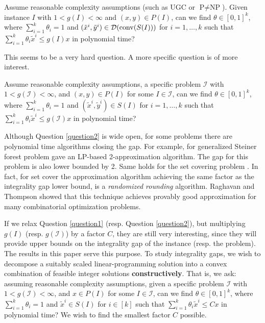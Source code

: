 \begin{question*}\label{question1}
	Assume reasonable complexity assumptions (such as UGC or $\textrm{P}\neq \textrm{NP}$). Given instance $I$ with $1<g(I)<\infty$ and $(x,y)\in P(I)$, can we find $\theta \in [0,1]^k$, where $\sum_{i=1}^{k}\theta_i =1$ and $(\tilde{x}^i,\tilde{y}^i)\in \operatorname{\mathcal{D}}(\operatorname{conv}(S(I)))$ for $i=1,\ldots,k$ such that $\sum_{i=1}^{k}\theta_i \tilde{x}^i\leq g(I)x$ in polynomial time?
\end{question*}

This seems to be a very hard question. A more specific question is of more interest.

\begin{question}\label{question2}
	Assume reasonable complexity assumptions, a specific problem $\mathcal{I}$ with  $1<g({\mathcal{I}})<\infty$, and $(x,y)\in P(I)$ for some $I\in \mathcal{I}$, can we find $\theta \in [0,1]^k$, where $\sum_{i=1}^{k}\theta_i =1$ and $(\tilde{x}^i,\tilde{y}^i)\in S(I)$ for $i=1,\ldots,k$ such that $\sum_{i=1}^{k}\theta_i \tilde{x}^i\leq g(\mathcal{I})x$ in polynomial time?
\end{question}
Although Question \ref{question2} is wide open, for some problems there are polynomial time algorithms closing the gap. For example, for generalized Steiner forest problem \cite{jain} gave an LP-based 2-approximation algorithm. The gap for this problem is also lower bounded by 2. Same holds for the set covering problem \cite{randomizedrounding}. In fact, for set cover the approximation algorithm achieving the same factor as the integrality gap lower bound, is a \textit{randomized rounding} algorithm. Raghavan and Thompson \cite{randomizedrounding} showed that this technique achieves provably good approximation for many combinatorial optimization problems.  

If we relax Question \ref{question1} (resp. Question \ref{question2}), but multiplying $g(I)$ (resp. $g(\mathcal{I})$) by a factor $C$, they are still very interesting, since they will provide upper bounds on the integrality gap of the instance (resp. the problem). The results in this paper serve this purpose.
\fi
To study integrality gaps, we wish to decompose a suitably scaled linear-programming solution into a convex combination of feasible integer solutions {\bf constructively}.  That is, we ask: assuming reasonable complexity assumptions, given a specific problem $\mathcal{I}$ with  $1<g(\mathcal{I})<\infty$, and $x\in P(I)$ for some $I\in \mathcal{I}$, can we find $\theta \in [0,1]^k$, where $\sum_{i=1}^{k}\theta_i =1$ and $\tilde{x}^i\in S(I)$ for $i\in [k]$ such that $\sum_{i=1}^{k}\theta_i \tilde{x}^i\leq Cx$ in polynomial time? We wish to find the smallest factor $C$ possible.

